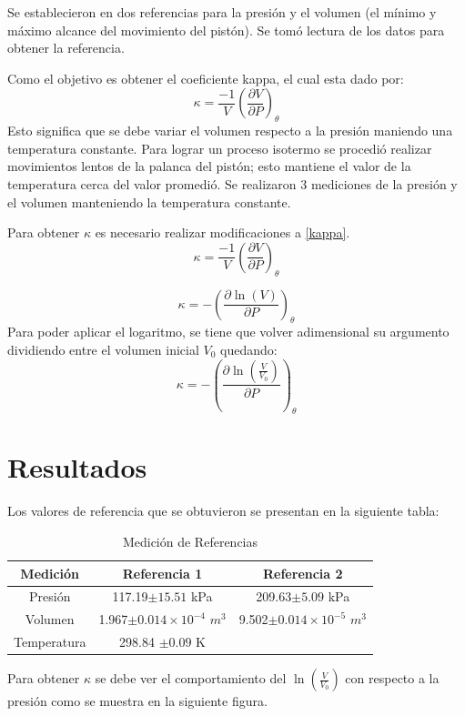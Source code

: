 \documentclass[12pt]{article}
\begin{document}
\hspace{0.75cm}Se establecieron en dos referencias para la presión y el volumen (el mínimo y máximo alcance del movimiento del pistón). Se tomó lectura de los datos para obtener la referencia.

Como el objetivo es obtener el coeficiente kappa, el cual esta dado por:
\begin{equation}\label{kappa}
\kappa = \frac{-1}{V} \left( \frac{\partial V}{\partial P} \right) _{\theta}
\end{equation}
\hspace{0.75cm} Esto significa que se debe variar el volumen respecto a la presión maniendo una temperatura constante. Para lograr un proceso isotermo se procedió realizar movimientos lentos de la palanca del pistón; esto mantiene el valor de la temperatura cerca del valor promedió. Se realizaron 3 mediciones de la presión y el volumen manteniendo la temperatura constante.

Para obtener $\kappa$ es necesario realizar modificaciones a \eqref{kappa}.
\begin{equation}
\kappa = \frac{-1}{V} \left( \frac{\partial V}{\partial P} \right) _{\theta}
\end{equation}

\begin{equation}
\kappa = -\left( \frac{\partial \ln(V)}{\partial P} \right) _{\theta}
\end{equation}
Para poder aplicar el logaritmo, se tiene que volver adimensional su argumento dividiendo entre  el volumen inicial $V_0$ quedando:
\begin{equation}
\kappa = -\left( \frac{\partial \ln \left(\frac{V}{V_0} \right)  }{\partial P} \right) _{\theta}
\end{equation}
\pagebreak
\section{Resultados}
Los valores de referencia que se obtuvieron se presentan en la siguiente tabla:

\begin{table}[H]
\centering
\begin{tabular}{|c|c|c|}
\hline
Medición  & Referencia 1  & Referencia 2 \\ \hline
   Presión     & 117.19$\pm15.51$ kPa& 209.63$\pm 5.09$ kPa \\ \hline
   Volumen &1.967$\pm0.014\times 10^{-4}$ $m^3$ &  9.502$\pm0.014\times 10^{-5}$ $m^3$  \\ \hline
   Temperatura  &  298.84 $\pm0.09$  K  &       \\ \hline
      
\end{tabular}
\caption{Medición de Referencias}
\end{table}
 Para obtener $\kappa$ se debe ver el comportamiento del $ \ln \left(\frac{V}{V_0} \right)$ con respecto a la presión como se muestra en la siguiente figura.
\end{document}

